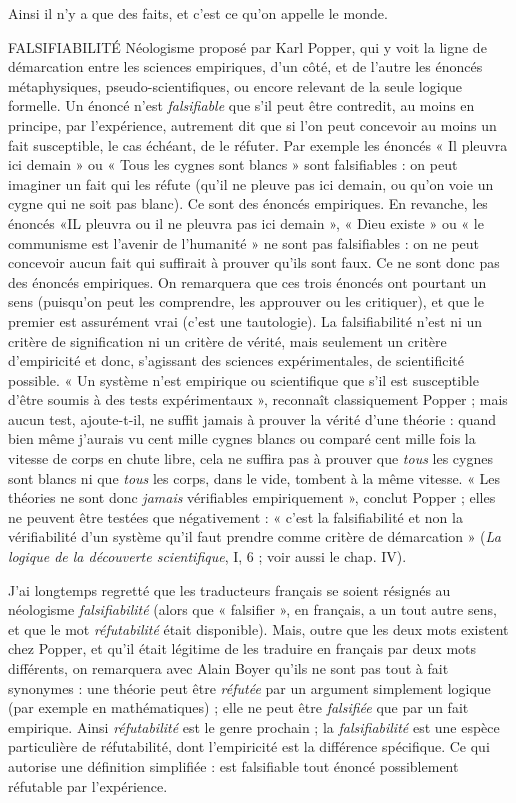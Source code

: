 Ainsi il n’y a que des faits, et c’est ce qu’on appelle le monde.

FALSIFIABILITÉ  Néologisme proposé par Karl Popper, qui y voit la ligne
de démarcation entre les sciences empiriques, d’un côté,
et de l’autre les énoncés métaphysiques, pseudo-scientifiques, ou encore relevant
de la seule logique formelle. Un énoncé n’est {\it falsifiable} que s’il peut être
contredit, au moins en principe, par l’expérience, autrement dit que si l’on peut
concevoir au moins un fait susceptible, le cas échéant, de le réfuter. Par
exemple les énoncés « Il pleuvra ici demain » ou « Tous les cygnes sont blancs »
sont falsifiables : on peut imaginer un fait qui les réfute (qu’il ne pleuve pas ici
demain, ou qu’on voie un cygne qui ne soit pas blanc). Ce sont des énoncés
empiriques. En revanche, les énoncés «IL pleuvra ou il ne pleuvra pas ici
demain », « Dieu existe » ou « le communisme est l’avenir de l’humanité » ne
sont pas falsifiables : on ne peut concevoir aucun fait qui suffirait à prouver
qu'ils sont faux. Ce ne sont donc pas des énoncés empiriques. On remarquera
que ces trois énoncés ont pourtant un sens (puisqu’on peut les comprendre, les
approuver ou les critiquer), et que le premier est assurément vrai (c'est une
tautologie). La falsifiabilité n’est ni un critère de signification ni un critère de
vérité, mais seulement un critère d’empiricité et donc, s'agissant des sciences
expérimentales, de scientificité possible. « Un système n’est empirique ou scientifique
que s’il est susceptible d’être soumis à des tests expérimentaux », reconnaît
classiquement Popper ; mais aucun test, ajoute-t-il, ne suffit jamais à
prouver la vérité d’une théorie : quand bien même j'aurais vu cent mille cygnes
blancs ou comparé cent mille fois la vitesse de corps en chute libre, cela ne suffira
pas à prouver que {\it tous} les cygnes sont blancs ni que {\it tous} les corps, dans le
vide, tombent à la même vitesse. « Les théories ne sont donc {\it jamais} vérifiables
empiriquement », conclut Popper ; elles ne peuvent être testées que négativement :
« c’est la falsifiabilité et non la vérifiabilité d’un système qu’il faut
prendre comme critère de démarcation » ({\it La logique de la découverte scientifique},
I, 6 ; voir aussi le chap. IV).

J'ai longtemps regretté que les traducteurs français se soient résignés au
néologisme {\it falsifiabilité} (alors que « falsifier », en français, a un tout autre sens,
et que le mot {\it réfutabilité} était disponible). Mais, outre que les deux mots existent
chez Popper, et qu’il était légitime de les traduire en français par deux
mots différents, on remarquera avec Alain Boyer qu’ils ne sont pas tout à fait
synonymes : une théorie peut être {\it réfutée} par un argument simplement logique
(par exemple en mathématiques) ; elle ne peut être {\it falsifiée} que par un fait
empirique. Ainsi {\it réfutabilité} est le genre prochain ; la {\it falsifiabilité} est une espèce
particulière de réfutabilité, dont l’empiricité est la différence spécifique. Ce qui
autorise une définition simplifiée : est falsifiable tout énoncé possiblement
réfutable par l’expérience.

